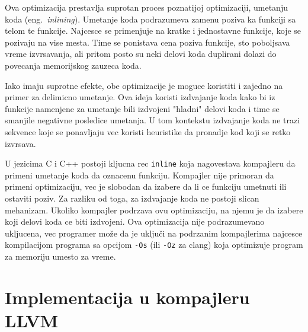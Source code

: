 \documentclass[12pt,oneside]{memoir}
\begin{document}
Ova optimizacija prestavlja suprotan proces poznatijoj optimizaciji, umetanju koda (eng.~{\em inlining}).
Umetanje koda podrazumeva zamenu poziva ka funkciji sa telom te funkcije.
Najcesce se primenjuje na kratke i jednostavne funkcije, koje se pozivaju na vise mesta.
Time se ponistava cena poziva funkcije, sto poboljsava vreme izvrsavanja, ali pritom posto su neki delovi koda duplirani dolazi do povecanja memorijskog zauzeca koda.


Iako imaju suprotne efekte, obe optimizacije je moguce koristiti i zajedno na primer za delimicno umetanje. %
Ova ideja koristi izdvajanje koda kako bi iz funkcije namenjene za umetanje bili izdvojeni "hladni" delovi koda i time se smanjile negativne posledice umetanja.
U tom kontekstu izdvajanje koda ne trazi sekvence koje se ponavljaju vec koristi heuristike da pronadje kod koji se retko izvrsava.

U jezicima C i C++ postoji kljucna rec \verb|inline| koja nagovestava kompajleru da primeni umetanje koda da oznacenu funkciju. %
Kompajler nije primoran da primeni optimizaciju, vec je slobodan da izabere da li ce funkciju umetnuti ili ostaviti poziv.
Za razliku od toga, za izdvajanje koda ne postoji slican mehanizam.
Ukoliko kompajler podrzava ovu optimizaciju, na njemu je da izabere koji delovi koda ce biti izdvojeni.
Ova optimizacija nije podrazumevano ukljucena, vec programer može da je uključi na podrzanim kompajlerima najcesce kompilacijom programa sa opcijom \verb|-Os| (ili \verb|-Oz| za clang) koja optimizuje program za memoriju umesto za vreme.

\section{Implementacija u kompajleru LLVM}
\end{document}
